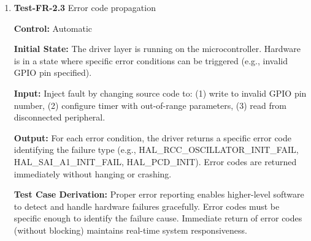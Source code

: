 \documentclass[12pt, titlepage]{article}
\begin{document}
\begin{enumerate}
\textbf{Input:}
Test requests from both modules attempting to access hardware resources: (1)
Module A requests GPIO write, (2) Module B requests GPIO write.
					
\textbf{Output:}
Module A's requests complete successfully with hardware operations executed.
Module B's requests are rejected by the driver layer, returning permission
denied error codes without executing hardware operations. 

\textbf{Test Case Derivation:} 
Permission-based access control prevents unauthorized or unintended hardware
operations that could compromise system safety or stability. The driver must
enforce access policies to maintain system integrity. Only authorized components
should control critical hardware like PIN writes and display interfaces.
					
\textbf{How test will be performed:}
Configure driver with permission rules for test modules. Execute test requests
from both modules in sequence. Verify Module A's requests succeed by checking
return codes. Verify Module B's requests are denied by checking for error codes.
Examine system logs to confirm permission checks occurred. The test passes if
all access decisions match configured permissions. System logs will show
permission checks for all requests.

\item{\textbf{Test-FR-2.3} Error code propagation\\}

\textbf{Control:} Automatic
					
\textbf{Initial State:} 
The driver layer is running on the microcontroller. Hardware is in a state where
specific error conditions can be triggered (e.g., invalid GPIO pin specified).
					
\textbf{Input:}
Inject fault by changing source code to: (1) write to invalid GPIO pin number,
(2) configure timer with out-of-range parameters, (3) read from disconnected
peripheral.
					
\textbf{Output:}
For each error condition, the driver returns a specific error code identifying
the failure type (e.g., HAL\_RCC\_OSCILLATOR\_INIT\_FAIL,
HAL\_SAI\_A1\_INIT\_FAIL, HAL\_PCD\_INIT). Error codes are
returned immediately without hanging or crashing. 

\textbf{Test Case Derivation:} 
Proper error reporting enables higher-level software to detect and handle
hardware failures gracefully. Error codes must be specific enough to identify
the failure cause. Immediate return of error codes (without blocking) maintains
real-time system responsiveness.
					

\end{enumerate}
\end{document}
